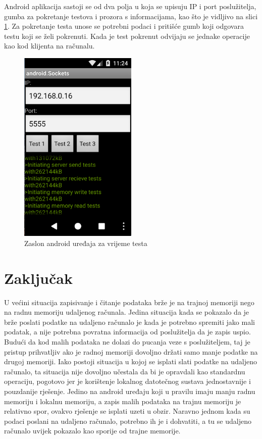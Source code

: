 \documentclass[times, utf8, zavrsni, square]{fer}
\begin{document}
Android aplikacija sastoji se od dva polja u koja se upisuju IP i port poslužitelja, gumba za pokretanje testova i prozora s informacijama, kao što je vidljivo na slici \ref{fig:android_ui}.
Za pokretanje testa unose se potrebni podaci i pritišće gumb koji odgovara testu koji se želi pokrenuti. 
Kada je test pokrenut odvijaju se jednake operacije kao kod klijenta na računalu.


   
\begin{figure}[h!]
    \centering
    \includegraphics[width=0.5\textwidth]{android_ui}
    \caption{Zaslon android uređaja za vrijeme testa}
    \label{fig:android_ui}
\end{figure} 
\chapter{Zaključak}
U većini situacija zapisivanje i čitanje podataka brže je na trajnoj memoriji nego na radnu memoriju udaljenog računala.
Jedina situacija kada se pokazalo da je brže poslati podatke na udaljeno računalo je kada je potrebno spremiti jako mali podatak, a nije potrebna povratna informacija od poslužitelja da je zapis uspio.
Budući da kod malih podataka ne dolazi do pucanja veze s poslužiteljem, taj je pristup prihvatljiv ako je radnoj memoriji dovoljno držati samo manje podatke na drugoj memoriji.
Iako postoji situacija u kojoj se isplati slati podatke na udaljeno računalo, ta situacija nije dovoljno učestala da bi je opravdali kao standardnu operaciju, pogotovo jer je korištenje lokalnog datotečnog sustava jednostavnije i pouzdanije rješenje.
Jedino na android uređaju koji u pravilu imaju manju radnu memoriju i lokalnu memoriju, a zapis malih podataka na trajnu memoriju je relativno spor, ovakvo rješenje se isplati uzeti u obzir.
Naravno jednom kada su podaci poslani na udaljeno računalo, potrebno ih je i dohvatiti, a tu se udaljeno računalo uvijek pokazalo kao sporije od trajne memorije.
\end{document}
